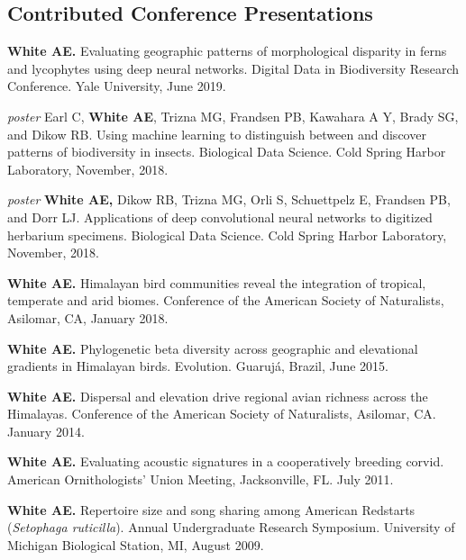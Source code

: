 \documentclass[letterpaper]{article}
\newenvironment{biblist}{%
   \begin{list}{}{%
     \setlength{\labelwidth}{0pt}%
     \setlength{\labelsep}{1em}%
     \setlength{\leftmargin}{2em}%
     \setlength{\itemindent}{-1em}%
   }
}{\end{list}}
\begin{document}
\subsection*{Contributed Conference Presentations}
\begin{biblist}
\item \textbf{White AE.} Evaluating geographic patterns of morphological disparity in ferns and lycophytes using deep neural networks. Digital Data in Biodiversity Research Conference. Yale University, June 2019.

\item \emph{poster} Earl C, \textbf{White AE}, Trizna MG, Frandsen PB, Kawahara A Y, Brady SG, and Dikow RB. Using machine learning to distinguish between and discover patterns of biodiversity in insects. Biological Data Science. Cold Spring Harbor Laboratory, November, 2018.

\item \emph{poster} \textbf{White AE,} Dikow RB, Trizna MG, Orli S, Schuettpelz E, Frandsen PB, and Dorr LJ. Applications of deep convolutional neural networks to digitized herbarium specimens. Biological Data Science. Cold Spring Harbor Laboratory, November, 2018.

\item \textbf{White AE.} Himalayan bird communities reveal the integration of tropical, temperate and arid biomes. Conference of the American Society of Naturalists, Asilomar, CA, January 2018.

\item \textbf{White AE.} Phylogenetic beta diversity across geographic and elevational gradients in Himalayan birds. Evolution. Guarujá, Brazil, June 2015.

\item \textbf{White AE.} Dispersal and elevation drive regional avian richness across the Himalayas. Conference of the American Society of Naturalists, Asilomar, CA. January 2014.

\item \textbf{White AE.} Evaluating acoustic signatures in a cooperatively breeding corvid. American Ornithologists' Union Meeting, Jacksonville, FL. July 2011.

\item \textbf{White AE.} Repertoire size and song sharing among American Redstarts (\textit{Setophaga ruticilla}). Annual Undergraduate Research Symposium. University of Michigan Biological Station, MI, August 2009.
\end{biblist}
\end{document}
